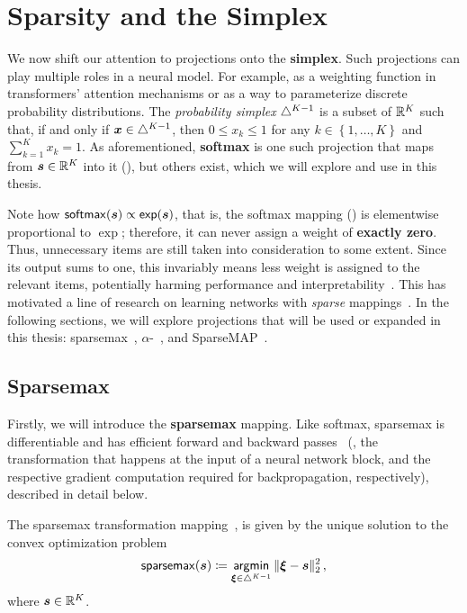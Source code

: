 \section{Sparsity and the Simplex}
\label{sec:sparsity_background}

\noindent We now shift our attention to projections onto the
\textbf{simplex}. Such projections can play multiple roles in a neural model.
For example, as a weighting function in transformers' attention mechanisms
or as a way to parameterize discrete probability distributions.
The \textit{probability simplex} $\triangle^{K-1}$
is a subset of $\mathbb{R}^K$ such that, if and only if $\bm{x}\in\triangle^{K-1}$,
then $0 \leq x_k \leq 1$ for any $k\in\left\{1, \dots, K\right\}$ and
$\sum_{k=1}^K x_k = 1$. As aforementioned, \textbf{softmax} is one
such projection that maps from $\bm{s}\in\mathbb{R}^K$ into it
(), but others exist, which we will explore and
use in this thesis.

Note how $\operatorname*{\mathsf{softmax}}(\bm{s}) \propto \operatorname*{\mathsf{exp}}(\bm{s})$, that is, the softmax
mapping () is elementwise proportional to $\exp$;
therefore, it can never assign a weight of \textbf{exactly zero}.
Thus, unnecessary items are still taken into consideration to some
extent. Since its output sums to one, this invariably means less
weight is assigned to the relevant items, potentially harming
performance and interpretability~\citep{jain2019attention}. This has
motivated a line of research on learning networks with \emph{sparse}
mappings~\citep{sparsemax,fusedmax,louizos,shao2019ssn}. In the
following sections, we will explore projections that will be used or
expanded in this thesis: sparsemax~\citep{sparsemax},
$\alpha$-\entmaxtext~\citep{blondel2019learning,entmax}, and
SparseMAP~\citep{sparsemap}.

\subsection{Sparsemax}\label{sec:sparsemax_bg}

\noindent Firstly, we will introduce the \textbf{sparsemax} mapping.
Like softmax, sparsemax is differentiable and has efficient forward
and backward passes~\citep{Held1974,sparsemax} (\ie, the
transformation that happens at the input of a neural network block,
and the respective gradient computation required for backpropagation,
respectively), described in detail below.

\begin{definition}[sparsemax]
    The sparsemax transformation
    mapping~\citep{sparsemax}, is given by the unique solution
    to the convex optimization problem
    \begin{equation}\label{eq:sparsemax}
        \operatorname*{\mathsf{sparsemax}}(\bm{s}) \coloneqq \operatorname*{\mathsf{argmin}}_{\bm{\xi} \in \triangle^{K-1}} \| \bm{\xi} - \bm{s} \|_2^2\,,
    \end{equation}
    where $\bm{s}\in\mathbb{R}^K$.
\end{definition}

